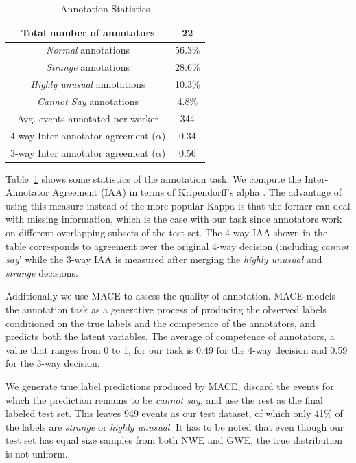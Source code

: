 \begin{table}
\begin{center}
  \begin{tabular}[c]{|c|c|}
 \hline
  Total number of annotators & 22\\
  \hline
  \textit{Normal} annotations & 56.3\% \\
  \hline
  \textit{Strange} annotations & 28.6\% \\
  \hline
  \textit{Highly unusual} annotations & 10.3\% \\
  \hline
  \textit{Cannot Say} annotations & 4.8\% \\
  \hline
  Avg. events annotated per worker & 344 \\
  \hline
  4-way Inter annotator agreement ($\alpha$) & 0.34 \\
  \hline
  3-way Inter annotator agreement ($\alpha$) & 0.56 \\
  \hline
  \end{tabular}
\end{center}
 \caption{Annotation Statistics}
 \label{table:annot}
\end{table}
Table~\ref{table:annot} shows some statistics of the annotation task.  We
compute the Inter-Annotator
Agreement (IAA) in terms of Kripendorff's alpha \citep{krippendorff1980content}. 
The advantage of using this
measure instead of the more popular Kappa is that the former can deal with
missing information, which is the case with
our task since annotators work on different overlapping subsets of the test set.
 The 4-way IAA shown in the table 
corresponds to agreement over the original 4-way decision (including
\textit{cannot say}' while the 3-way IAA is measured after merging the 
\textit{highly unusual} and \textit{strange} decisions.  

Additionally we use
MACE \citep{hovy2013learning} to assess the quality of 
annotation.  MACE models the annotation task as a generative process of
producing the observed labels conditioned on the 
true labels and the competence of the annotators, and predicts both the latent
variables.  The average of competence of annotators, 
a value that ranges from 0 to 1, for our task is 0.49 for the 4-way decision and
0.59 for the 3-way decision.  

We generate
true label predictions produced by MACE, discard the events for which the
prediction remains to be \textit{cannot say}, and use the 
rest as the final labeled test set.  This leaves 949 events as our test dataset,
of which only 41\% of the labels are \textit{strange} or \textit{highly
unusual}.  It has to be noted that even though our test set 
has equal size samples from both NWE and GWE, the true distribution is not
uniform.


